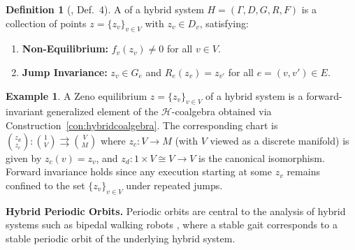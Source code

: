 \documentclass[letterpaper, 10 pt, conference]{IEEEconf}
\newcommand{\subsect}[1]{\vspace{0.5em}\noindent\textbf{#1.}}
\theoremstyle{definition}
\newtheorem{defn}[thm]{Definition}
\newtheorem{example}[thm]{Example}
\newcommand{\define}[1]{{\bf \boldmath{#1}}}
\newcommand{\maps}{\colon}
\newcommand{\functor}[1]{\mathcal{#1}}
\renewcommand{\H}{\functor{H}}
\begin{document}
\begin{defn}[\cite{lamperski2012lyapunov}, Def.\ 4]
\label{def:ZenoEquilibrium}
    A \define{Zeno equilibrium} of a hybrid system $H = (\Gamma, D, G, R, F)$ is a collection of points $z = \{z_v\}_{v \in V}$ with $z_v \in D_v$, satisfying:
    \begin{enumerate}
        \item \textbf{Non-Equilibrium:} $f_v(z_v) \neq 0$ for all $v \in V$.
        \item \textbf{Jump Invariance:} $z_v \in G_e$ and $R_e(z_v) = z_{v'}$ for all $e = (v, v') \in E$.
    \end{enumerate}
\end{defn}

\begin{example}
\label{ex:zenogeneralized}
    A Zeno equilibrium $z = \{z_v\}_{v \in V}$ of a hybrid system is a forward-invariant generalized element of the $\H$-coalgebra obtained via Construction~\ref{con:hybridcoalgebra}. The corresponding chart is $\binom{z_d}{z_c} \maps \binom{1}{V} \rightrightarrows \binom{V}{M}$ where $z_c \maps V \to M$ (with $V$ viewed as a discrete manifold) is given by $z_c(v) = z_v$, and $z_d \maps 1 \times V \cong V \to V$ is the canonical isomorphism. Forward invariance holds since any execution starting at some $z_v$ remains confined to the set $\{z_v\}_{v \in V}$ under repeated jumps.
\end{example}

\subsect{Hybrid Periodic Orbits}
%
Periodic orbits are central to the analysis of hybrid systems such as bipedal walking robots \cite{spong2005controlled, RESCLF}, where a stable gait corresponds to a stable periodic orbit of the underlying hybrid system.
\end{document}
